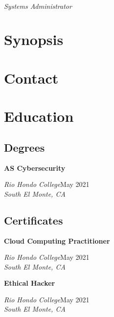 \documentclass[a4paper]{article}
\begin{document}
\begin{minipage}[t]{0.36\textwidth}
    \raggedright
    \vspace*{0pt}
    {\bfseries\LARGE\textsf\appfirstname{}} {\bfseries\LARGE\textsf\applastname{}} \\
    {\large\textit{Systems Administrator}}

    \section{Synopsis}
    \appsynopsis{}

    \section{Contact}
    \vbox{
    }

    \section{Education}
    \subsection{Degrees}
    \textbf{AS Cybersecurity}\par
    \textit{Rio Hondo College}\hfill May 2021 \\
    \textit{South El Monte, CA}

    \subsection{Certificates}
    \textbf{Cloud Computing Practitioner}\par
    \textit{Rio Hondo College}\hfill May 2021 \\
    \textit{South El Monte, CA}

    \textbf{Ethical Hacker}\par
    \textit{Rio Hondo College}\hfill May 2021 \\
    \textit{South El Monte, CA}
\end{minipage}\hfill
\end{document}
